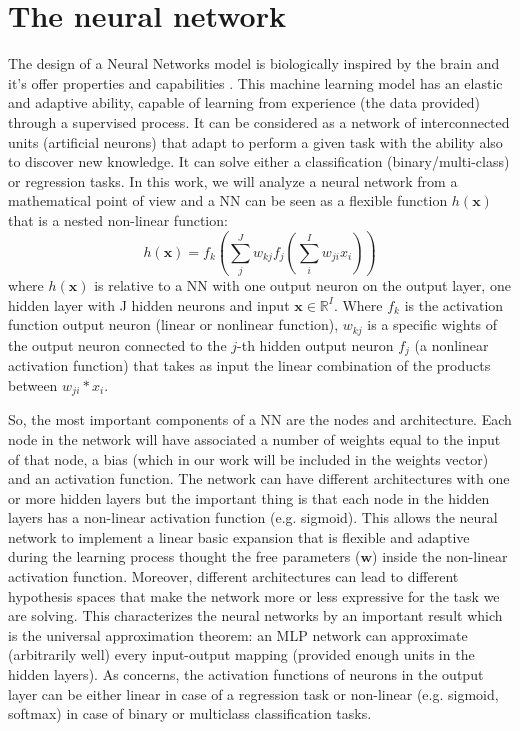 \documentclass[11pt]{article}
\begin{document}
\section{The neural network}
\label{sec:NN}
The design of a Neural Networks model is biologically inspired by the brain and it's offer properties and capabilities \cite{Mitchell97,Goodfellow-et-al-2016, haykin2009neural}. This machine learning model has an elastic and adaptive ability, capable of learning from experience (the data provided) through a supervised process.  It can be considered as a network of interconnected units (artificial neurons) that adapt to perform a given task with the ability also to discover new knowledge. It can solve either a classification (binary/multi-class) or regression tasks. In this work, we will analyze a neural network from a mathematical point of view and a NN can be seen as a flexible function $h(\mathbf{x})$ that is a nested non-linear function:
\begin{equation}
    \label{eq:nn_function}
    h(\mathbf{x}) = f_k \left( \sum_{j}^J w_{kj} f_j \left( \sum_{i}^I w_{ji}x_i \right)\right) %
\end{equation}
where $h(\mathbf{x})$ is relative to a NN with one output neuron on the output layer, one hidden layer with J hidden neurons and input $\mathbf{x} \in \mathbb{R}^I$. Where $f_k$ is the activation function output neuron (linear or nonlinear function), $w_{kj}$ is a specific wights of the output neuron connected to the $j$-th hidden output neuron $f_j$ (a nonlinear activation function) that takes as input the linear combination of the products between $w_{ji}*x_i$.

So, the most important components of a NN are the nodes and architecture. Each node in the network will have associated a number of weights equal to the input of that node, a bias (which in our work will be included in the weights vector) and an activation function. The network can have different architectures with one or more hidden layers but the important thing is that each node in the hidden layers has a non-linear activation function (e.g. sigmoid). This allows the neural network to implement a linear basic expansion that is flexible and adaptive during the learning process thought the free parameters ($\mathbf{w}$) inside the non-linear activation function. Moreover, different architectures can lead to different hypothesis spaces that make the network more or less expressive for the task we are solving. This characterizes the neural networks by an important result which is the universal approximation theorem: an MLP network can approximate (arbitrarily well) every input-output mapping (provided enough units in the hidden layers). As concerns, the activation functions of neurons in the output layer can be either linear in case of a regression task or non-linear (e.g. sigmoid, softmax) in case of binary or multiclass classification tasks.
\end{document}

